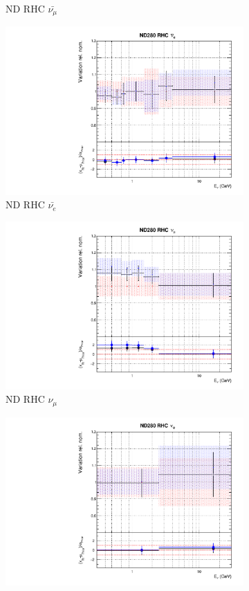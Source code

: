 \begin{figure}
\begin{subfigure}{0.24\textwidth}
  \caption{ND RHC $\bar{\nu_{\mu}}$}
\end{subfigure}
\begin{subfigure}{0.24\textwidth}
  \centering
  \includegraphics[width=0.95\linewidth]{figs/comp5q2vs8q2flux5}
  \caption{ND RHC $\bar{\nu_{e}}$}
\end{subfigure}
\begin{subfigure}{0.24\textwidth}
  \centering
  \includegraphics[width=0.95\linewidth]{figs/comp5q2vs8q2flux6}
  \caption{ND RHC $\nu_{\mu}$}
\end{subfigure}
\vspace{15mm}
\begin{subfigure}{0.24\textwidth}
  \centering
  \includegraphics[width=0.95\linewidth]{figs/comp5q2vs8q2flux7}

\end{subfigure}
\end{figure}
